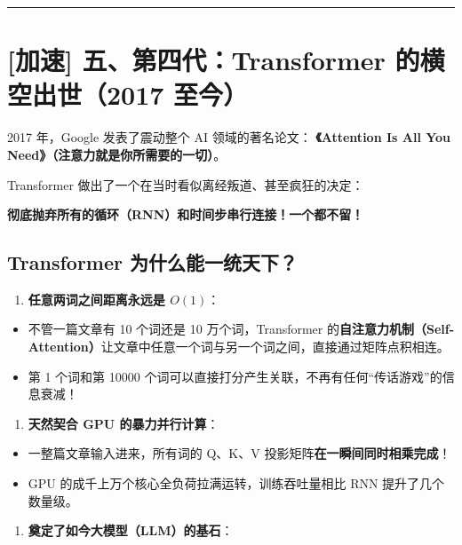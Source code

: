 \vspace{0.8em}\hrule\vspace{0.8em}

\section{[加速] 五、第四代：Transformer 的横空出世（2017 至今）}

2017 年，Google 发表了震动整个 AI 领域的著名论文：
\textbf{《Attention Is All You Need》（注意力就是你所需要的一切）}。

Transformer 做出了一个在当时看似离经叛道、甚至疯狂的决定：
\begin{noteBox}[核心导读与背景]
\textbf{彻底抛弃所有的循环（RNN）和时间步串行连接！一个都不留！}
\end{noteBox}

\subsection{Transformer 为什么能一统天下？}

\begin{enumerate}
  \item \textbf{任意两词之间距离永远是 $O(1)$}：
\end{enumerate}

\begin{itemize}
  \item 不管一篇文章有 10 个词还是 10 万个词，Transformer 的\textbf{自注意力机制（Self-Attention）}让文章中任意一个词与另一个词之间，直接通过矩阵点积相连。
  \item 第 1 个词和第 10000 个词可以直接打分产生关联，不再有任何“传话游戏”的信息衰减！
\end{itemize}

\begin{enumerate}
  \item \textbf{天然契合 GPU 的暴力并行计算}：
\end{enumerate}

\begin{itemize}
  \item 一整篇文章输入进来，所有词的 Q、K、V 投影矩阵\textbf{在一瞬间同时相乘完成}！
  \item GPU 的成千上万个核心全负荷拉满运转，训练吞吐量相比 RNN 提升了几个数量级。
\end{itemize}

\begin{enumerate}
  \item \textbf{奠定了如今大模型（LLM）的基石}：
\end{enumerate}

